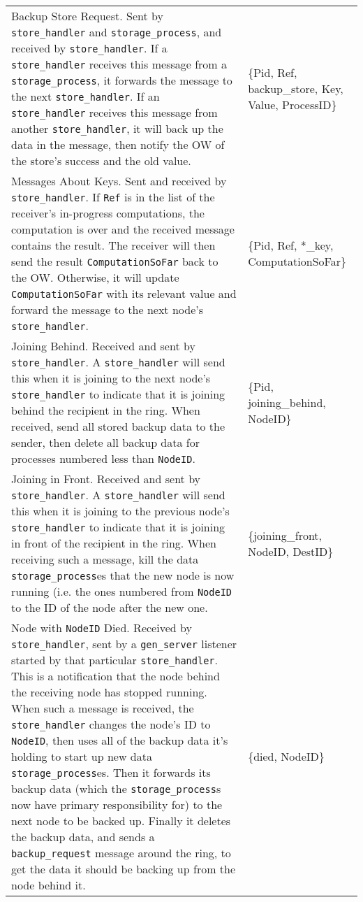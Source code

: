 \documentclass[12pt,letterpaper]{article}
\renewcommand{\tt}[1]{\texttt{#1}}
\newcommand{\sh}{\tt{store\_handler}}
\renewcommand{\sp}{\tt{storage\_process}}
\newcommand{\gs}{\tt{gen\_server}}
\begin{document}
\begin{longtable}{p{4.5in}T}
Backup Store Request. Sent by \sh{} and \sp, and received by \sh. If a \sh{} receives this message from a \sp, it forwards the message to the next \sh. If an \sh{} receives this message from another \sh, it will back up the data in the message, then notify the OW of the store's success and the old value. & 
\{Pid, Ref, backup\_store, Key, Value, ProcessID\} \\

Messages About Keys.  Sent and received by \sh.  If \tt{Ref} is in the list of the receiver's in-progress computations, the computation is over and the received message contains the result. The receiver will then send the result \tt{ComputationSoFar} back to the OW.  Otherwise, it will update \tt{ComputationSoFar} with its relevant value and forward the message to the next node's \sh.  &
\{Pid, Ref, *\_key, ComputationSoFar\} \\

Joining Behind. Received and sent by \sh. A \sh{} will send this when it is joining to the next node's \sh{} to indicate that it is joining behind the recipient in the ring. When received, send all stored backup data to the sender, then delete all backup data for processes numbered less than \tt{NodeID}. &
\{Pid, joining\_behind, NodeID\} \\

Joining in Front.  Received and sent by \sh. A \sh{} will send this when it is joining to the previous node's \sh{} to indicate that it is joining in front of the recipient in the ring. When receiving such a message, %
kill the data \sp es that the new node is now running (i.e. the ones numbered from \tt{NodeID} to the ID of the node after the new one. &
\{joining\_front, NodeID, DestID\} \\

Node with \tt{NodeID} Died.  Received by \sh, sent by a \gs{} listener started by that particular \sh. This is a notification that the node behind the receiving node has stopped running. When such a message is received, the \sh{} changes the node's ID to \tt{NodeID}, then uses all of the backup data it's holding to start up new data \sp es. Then it forwards its backup data (which the \sp s now have primary responsibility for) to the next node to be backed up. Finally it deletes the backup data, and sends a \tt{backup\_request} message around the ring, to get the data it should be backing up from the node behind it. & \{died, NodeID\} \\


\end{longtable}
\end{document}

